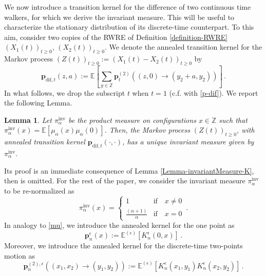 \documentclass[a4paper,11pt,oneside,reqno]{amsart}
\newtheorem{lemma}[theorem]{Lemma}
\theoremstyle{definition}
\renewcommand{\geq}{\geqslant}
\numberwithin{equation}{section}
\begin{document}
We now introduce a transition kernel for the difference of two continuous time walkers, for which we derive the invariant measure. This will be useful to characterize the stationary distribution of its discrete-time counterpart. To this aim, consider two copies of the RWRE of Definition \ref{definition-RWRE} $(X_{1}(t))_{t\geq 0}$, $(X_{2}(t))_{t\geq 0}$. We denote the annealed transition kernel for the Markov process $\left(Z(t)\right)_{t\geq 0}:=\left(X_{1}(t)-X_{2}(t)\right)_{t\geq 0}$ by
\begin{equation*}
	\mathbf{p}_{\text{dif},t}(z,a):=\mathbb{E}\left[\sum_{y\in \mathbb{Z}}\mathbf{p}^{(2)}_{t}((z,0)\to (y_{2}+a,y_{2}))\right]\,.
\end{equation*}
In what follows, we drop the subscript $t$ when $t=1$ (c.f. with \eqref{p-dif}). We  report the following Lemma.
\begin{lemma}\label{Lemma-inv-pdiff}
	Let $\pi^{\text{inv}}_{\alpha}$ be the product measure on configurations $x\in \mathbb{Z}$ such that $\pi^{\text{inv}}_{\alpha}(x)=\mathbb{E}[\mu_{\alpha}(x)\mu_{\alpha}(0)]$. Then, the Markov process $(Z(t))_{t\geq 0}$, with annealed transition kernel $\mathbf{p}_{\text{dif},t}(\cdot,\cdot)$, has a unique invariant measure given by $ \pi^{\text{inv}}_{\alpha}$. 
\end{lemma}
Its proof is an immediate consequence of Lemma \ref{Lemma-invariantMeasure-K}, then is omitted.
For the rest of the paper, we consider the invariant measure $\pi^{\text{inv}}_{\alpha}$ to be re-normalized as
\begin{equation}\label{normalized-piInv}
	\pi^{\text{inv}}_{\alpha}(x)=\begin{cases}
		1&\text{if}\quad x\neq 0\\
		\frac{(\alpha+1)}{\alpha}&\text{if}\quad x=0
	\end{cases}\,.
\end{equation}
In analogy to \eqref{mu}, we introduce the annealed kernel for the one point as 
\begin{equation*}
	\mathbf{p}_{n}^{\epsilon}(x):=\mathbb{E}^{(\epsilon)}\left[K_{n}^{\epsilon}(0,x)\right]\,.
\end{equation*}
Moreover, we introduce the annealed kernel for the discrete-time two-points motion as
\begin{equation}\label{p-espsilon}
	\mathbf{p}_{n}^{(2),\epsilon}\left((x_{1},x_{2})\to (y_{1},y_{2})\right):=\mathbb{E}^{(\epsilon)}\left[K_{n}^{\epsilon}(x_{1},y_{1})K_{n}^{\epsilon}(x_{2},y_{2})\right]\,.
\end{equation}
\end{document}
